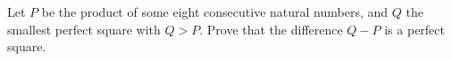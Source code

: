 \problem{}
Let $P$ be the product of some eight consecutive natural numbers, and $Q$ the smallest
perfect square with $Q > P$.
Prove that the difference $Q - P$ is a perfect square.
\solution
\endproblem
